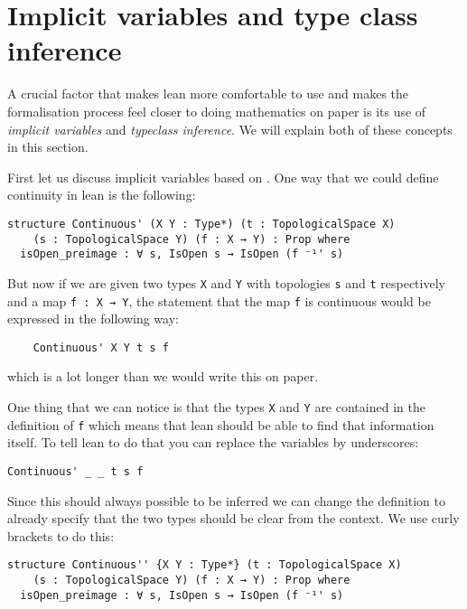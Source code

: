 \section{Implicit variables and type class inference}

A crucial factor that makes lean more comfortable to use and makes the formalisation process feel closer to doing mathematics on paper is its use of \emph{implicit variables} and \emph{typeclass inference}. 
We will explain both of these concepts in this section. 

First let us discuss implicit variables based on \cite{Avigad2024}. 
One way that we could define continuity in lean is the following: 

\begin{lstlisting}
structure Continuous' (X Y : Type*) (t : TopologicalSpace X) 
    (s : TopologicalSpace Y) (f : X → Y) : Prop where
  isOpen_preimage : ∀ s, IsOpen s → IsOpen (f ⁻¹' s)
\end{lstlisting}

But now if we are given two types \lstinline{X} and \lstinline{Y} with topologies \lstinline{s} and \lstinline{t} respectively and a map \lstinline{f : X → Y}, the statement that the map \lstinline{f} is continuous would be expressed in the following way: 

\begin{lstlisting}
    Continuous' X Y t s f
\end{lstlisting}

which is a lot longer than we would write this on paper. 

One thing that we can notice is that the types \lstinline{X} and \lstinline{Y} are contained in the definition of \lstinline{f} which means that lean should be able to find that information itself. 
To tell lean to do that you can replace the variables by underscores: 

\begin{lstlisting}
Continuous' _ _ t s f
\end{lstlisting}

Since this should always possible to be inferred we can change the definition to already specify that the two types should be clear from the context. 
We use curly brackets to do this: 

\begin{lstlisting}
structure Continuous'' {X Y : Type*} (t : TopologicalSpace X) 
    (s : TopologicalSpace Y) (f : X → Y) : Prop where
  isOpen_preimage : ∀ s, IsOpen s → IsOpen (f ⁻¹' s)
\end{lstlisting}

